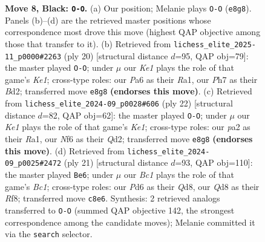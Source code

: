 \documentclass[11pt]{article}
\begin{document}
\begin{figure}[p]
\caption{\textbf{Move 8, Black: \texttt{O-O}.} (a) Our position; Melanie plays \texttt{O-O} (\texttt{e8g8}). Panels (b)--(d) are the retrieved master positions whose correspondence most drove this move (highest QAP objective among those that transfer to it). (b) Retrieved from \texttt{lichess\_elite\_2025-11\_p0000\#2263} (ply 20) [structural distance $d$=95, QAP obj=79]: the master played \texttt{O-O}; under $\mu$ our \emph{Ke1} plays the role of that game's \emph{Ke1}; cross-type roles: our \emph{P}a6 as their \emph{R}a1, our \emph{P}h7 as their \emph{B}d2; transferred move \texttt{e8g8} \textbf{(endorses this move)}. (c) Retrieved from \texttt{lichess\_elite\_2024-09\_p0028\#606} (ply 22) [structural distance $d$=82, QAP obj=62]: the master played \texttt{O-O}; under $\mu$ our \emph{Ke1} plays the role of that game's \emph{Ke1}; cross-type roles: our \emph{p}a2 as their \emph{R}a1, our \emph{N}f6 as their \emph{Q}d2; transferred move \texttt{e8g8} \textbf{(endorses this move)}. (d) Retrieved from \texttt{lichess\_elite\_2024-09\_p0025\#2472} (ply 21) [structural distance $d$=93, QAP obj=110]: the master played \texttt{Be6}; under $\mu$ our \emph{Bc1} plays the role of that game's \emph{Bc1}; cross-type roles: our \emph{P}d6 as their \emph{Q}d8, our \emph{Q}d8 as their \emph{R}f8; transferred move \texttt{c8e6}. Synthesis: 2 retrieved analogs transferred to \texttt{O-O} (summed QAP objective 142, the strongest correspondence among the candidate moves); Melanie committed it via the \texttt{search} selector.}
\label{fig:thought-m15}
\end{figure}

\clearpage
\end{document}
